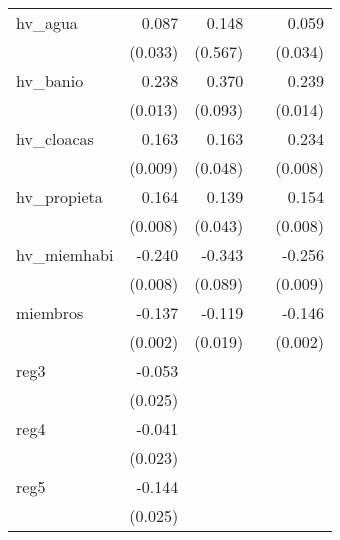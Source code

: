 {\begin{longtable}{l*{4}{D{.}{.}{-1}}}
\addlinespace
hv\_agua     &       0.087\sym{**} &       0.148         &                     &       0.059         \\
            &     (0.033)         &     (0.567)         &                     &     (0.034)         \\
\addlinespace
hv\_banio    &       0.238\sym{***}&       0.370\sym{***}&                     &       0.239\sym{***}\\
            &     (0.013)         &     (0.093)         &                     &     (0.014)         \\
\addlinespace
hv\_cloacas  &       0.163\sym{***}&       0.163\sym{***}&                     &       0.234\sym{***}\\
            &     (0.009)         &     (0.048)         &                     &     (0.008)         \\
\addlinespace
hv\_propieta &       0.164\sym{***}&       0.139\sym{**} &                     &       0.154\sym{***}\\
            &     (0.008)         &     (0.043)         &                     &     (0.008)         \\
\addlinespace
hv\_miemhabi &      -0.240\sym{***}&      -0.343\sym{***}&                     &      -0.256\sym{***}\\
            &     (0.008)         &     (0.089)         &                     &     (0.009)         \\
\addlinespace
miembros    &      -0.137\sym{***}&      -0.119\sym{***}&                     &      -0.146\sym{***}\\
            &     (0.002)         &     (0.019)         &                     &     (0.002)         \\
\addlinespace
reg3        &      -0.053\sym{*}  &                     &                     &                     \\
            &     (0.025)         &                     &                     &                     \\
\addlinespace
reg4        &      -0.041         &                     &                     &                     \\
            &     (0.023)         &                     &                     &                     \\
\addlinespace
reg5        &      -0.144\sym{***}&                     &                     &                     \\
            &     (0.025)         &                     &                     &                     \\

\end{longtable}}
